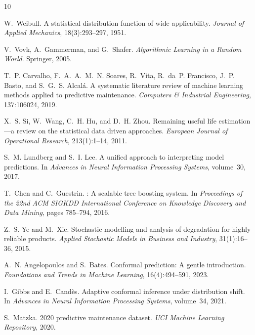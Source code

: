 \documentclass[12pt, a4paper]{article}
\begin{document}
\newpage


\begin{thebibliography}{10}

W.~Weibull.
\newblock A statistical distribution function of wide applicability.
\newblock \textit{Journal of Applied Mechanics}, 18(3):293--297, 1951.

V.~Vovk, A.~Gammerman, and G.~Shafer.
\newblock \textit{Algorithmic Learning in a Random World}.
\newblock Springer, 2005.

T.~P. Carvalho, F.~A.~A.~M.~N. Soares, R.~Vita, R.~da~P. Francisco, J.~P. Basto, and S.~G.~S. Alcal\'{a}.
\newblock A systematic literature review of machine learning methods applied to predictive maintenance.
\newblock \textit{Computers \& Industrial Engineering}, 137:106024, 2019.

X.~S. Si, W.~Wang, C.~H. Hu, and D.~H. Zhou.
\newblock Remaining useful life estimation---a review on the statistical data driven approaches.
\newblock \textit{European Journal of Operational Research}, 213(1):1--14, 2011.

S.~M. Lundberg and S.~I. Lee.
\newblock A unified approach to interpreting model predictions.
\newblock In \textit{Advances in Neural Information Processing Systems}, volume~30, 2017.

T.~Chen and C.~Guestrin.
: A scalable tree boosting system.
\newblock In \textit{Proceedings of the 22nd ACM SIGKDD International Conference on Knowledge Discovery and Data Mining}, pages 785--794, 2016.

Z.~S. Ye and M.~Xie.
\newblock Stochastic modelling and analysis of degradation for highly reliable products.
\newblock \textit{Applied Stochastic Models in Business and Industry}, 31(1):16--36, 2015.

A.~N. Angelopoulos and S.~Bates.
\newblock Conformal prediction: A gentle introduction.
\newblock \textit{Foundations and Trends in Machine Learning}, 16(4):494--591, 2023.

I.~Gibbs and E.~Cand\`{e}s.
\newblock Adaptive conformal inference under distribution shift.
\newblock In \textit{Advances in Neural Information Processing Systems}, volume~34, 2021.

S.~Matzka.
 2020 predictive maintenance dataset.
\newblock \textit{UCI Machine Learning Repository}, 2020.

\end{thebibliography}
\end{document}
